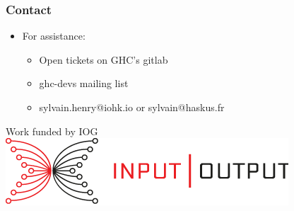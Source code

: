 \documentclass{beamer}
\begin{document}
\begin{frame}
\frametitle{Contact}
  \begin{itemize}
    \item For assistance:
      \begin{itemize}
        \item Open tickets on GHC's gitlab
        \item ghc-devs mailing list
        \item sylvain.henry@iohk.io or sylvain@haskus.fr
      \end{itemize}
  \end{itemize}
  \vspace{2cm}
  \begin{center}
  Work funded by IOG\\\includegraphics[scale=0.3]{images/iohk-logo.png}
  \end{center}
\end{frame}
\end{document}
